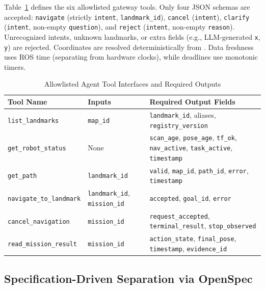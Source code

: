 \documentclass[conference,a4paper]{IEEEtran}
\begin{document}
Table~\ref{tab:interfaces} defines the six allowlisted gateway tools. Only four JSON schemas are accepted: \texttt{navigate} (strictly \texttt{intent}, \texttt{landmark\_id}), \texttt{cancel} (\texttt{intent}), \texttt{clarify} (\texttt{intent}, non-empty \texttt{question}), and \texttt{reject} (\texttt{intent}, non-empty \texttt{reason}). Unrecognized intents, unknown landmarks, or extra fields (e.g., LLM-generated \texttt{x}, \texttt{y}) are rejected. Coordinates are resolved deterministically from . Data freshness uses ROS time (separating  from hardware clocks), while deadlines use monotonic timers.

\begin{table}[!t]
\caption{Allowlisted Agent Tool Interfaces and Required Outputs}
\label{tab:interfaces}
\centering
\scriptsize
\setlength{\tabcolsep}{3pt}
\begin{tabularx}{\columnwidth}{@{} >{\raggedright\arraybackslash}p{2.65cm} >{\raggedright\arraybackslash}p{1.65cm} >{\raggedright\arraybackslash}X @{}}
\toprule
\textbf{Tool Name} & \textbf{Inputs} & \textbf{Required Output Fields} \\
\midrule
\texttt{list\_\allowbreak landmarks} & \texttt{map\_id} & \texttt{landmark\_id}, aliases, \texttt{registry\_\allowbreak version} \\
\texttt{get\_robot\_\allowbreak status} & None & \texttt{scan\_age}, \texttt{pose\_age}, \texttt{tf\_ok}, \texttt{nav\_active}, \texttt{task\_active}, \texttt{timestamp} \\
\texttt{get\_path} & \texttt{landmark\_id} & \texttt{valid}, \texttt{map\_id}, \texttt{path\_id}, \texttt{error}, \texttt{timestamp} \\
\texttt{navigate\_to\_\allowbreak landmark} & \texttt{landmark\_id}, \texttt{mission\_id} & \texttt{accepted}, \texttt{goal\_id}, \texttt{error} \\
\texttt{cancel\_\allowbreak navigation} & \texttt{mission\_id} & \texttt{request\_\allowbreak accepted}, \texttt{terminal\_\allowbreak result}, \texttt{stop\_\allowbreak observed} \\
\texttt{read\_mission\_\allowbreak result} & \texttt{mission\_id} & \texttt{action\_\allowbreak state}, \texttt{final\_pose}, \texttt{timestamp}, \texttt{evidence\_id} \\
\bottomrule
\end{tabularx}
\end{table}

\subsection{Specification-Driven Separation via OpenSpec}
\end{document}
